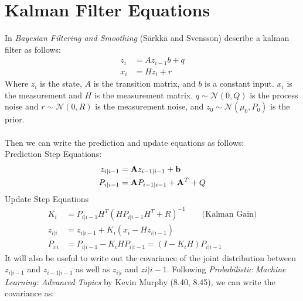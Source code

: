\documentclass[12pt]{article}
\begin{document}
\section{Kalman Filter Equations} \label{sec:kalman_filter}
In \textit{Bayesian Filtering and Smoothing} (S\"arkk\"a and Svensson) describe a kalman filter as follows:
\begin{align}
    z_i &= Az_{i-1} b + q \\
    x_i &= H z_i + r
\end{align}
Where $z_i$ is the state, $A$ is the transition matrix, and $b$ is a constant input. $x_i$ is the measurement and $H$ is the measurement matrix. $q \sim \mathcal{N}(0, Q)$ is the process noise
and $r \sim \mathcal{N}(0, R)$ is the measurement noise, and $z_0 \sim \mathcal{N}(\mu_0, P_0)$ is the prior.  \\
\\
Then we can write the prediction and update equations as follows:\\
Prediction Step Equations:
\begin{align}
    z_{i|i-1} &= \mathbf{A} z_{i-1|i-1} + \mathbf{b} \\
    P_{i|i-1} &= \mathbf{A} P_{i-1|i-1} + \mathbf{A}^T + Q \\
\end{align}
Update Step Equations
\begin{align}
    K_i  &= P_{i|i-1}H^T(HP_{i|i-1}H^T + R)^{-1} \qquad \text{(Kalman Gain)} \\
    z_{i|i} &= z_{i|i-1} + K_i (x_i - Hz_{i|i-1})  \\
    P_{i|i} &= P_{i|i-1} - K_i H P_{i|i-1} = (I-K_iH) P_{i|i-1}
\end{align}
It will also be useful to write out the covariance of the joint distribution between $z_{i|i-1}$ and $z_{i-1|i-1}$ as well as $z_{i|i}$ and $z{i|i-1}$.
Following \textit{Probabilistic Machine Learning: Advanced Topics} by Kevin Murphy (8.40, 8.45), we can write the covariance as:
\end{document}
